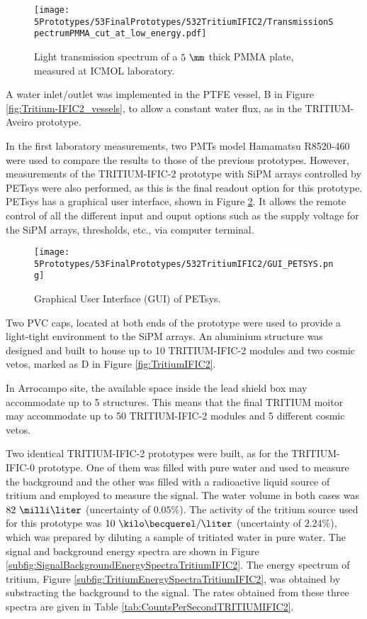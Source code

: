 \begin{figure}[h]
\centering
\texttt{[image: 5Prototypes/53FinalPrototypes/532TritiumIFIC2/TransmissionSpectrumPMMA\_cut\_at\_low\_energy.pdf]}
\caption{Light transmission spectrum of a $5~\mm$ thick PMMA plate, measured at ICMOL laboratory. \label{fig:PMMATransmissionSpectrum}}
\end{figure}	

A water inlet/outlet was implemented in the PTFE vessel, B in Figure \ref{fig:Tritium-IFIC2_vessels}, to allow a constant water flux, as in the TRITIUM-Aveiro prototype.

In the first laboratory measurements, two PMTs model Hamamatsu R8520-460 \cite{DataSheetPMTs} were used to compare the results to those of the previous prototypes. However, measurements of the TRITIUM-IFIC-2 prototype with SiPM arrays controlled by PETsys were also performed, as this is the final readout option for this prototype. PETsys has a graphical user interface, shown in Figure \ref{fig:GUI_PETSYS}. It allows the remote control of all the different input and ouput options such as the supply voltage for the SiPM arrays, thresholds, etc., via computer terminal. 

\begin{figure}[h]
\centering
\texttt{[image: 5Prototypes/53FinalPrototypes/532TritiumIFIC2/GUI\_PETSYS.png]}
\caption{Graphical User Interface (GUI) of PETsys.\label{fig:GUI_PETSYS}}
\end{figure}

Two PVC caps, located at both ends of the prototype were used to provide a light-tight environment to the SiPM arrays. An aluminium structure was designed and built to house up to 10 TRITIUM-IFIC-2 modules and two cosmic vetos, marked as D in Figure \ref{fig:TritiumIFIC2}.

In Arrocampo site, the available space inside the lead shield box may accommodate up to 5 structures. This means that the final TRITIUM moitor may accommodate up to 50 TRITIUM-IFIC-2 modules and 5 different cosmic vetos.

Two identical TRITIUM-IFIC-2 prototypes were built, as for the TRITIUM-IFIC-0 prototype. One of them was filled with pure water and used to measure the background and the other was filled with a radioactive liquid source of tritium and employed to measure the signal. The water volume in both cases was $82~\milli\liter$ (uncertainty of $0.05\%$). The activity of the tritium source used for this prototype was $10~\kilo\becquerel/\liter$ (uncertainty of $2.24\%$), which was prepared by diluting a sample of tritiated water in pure water. The signal and background energy spectra are shown in Figure \ref{subfig:SignalBackgroundEnergySpectraTritiumIFIC2}. The energy spectrum of tritium, Figure \ref{subfig:TritiumEnergySpectraTritiumIFIC2}, was obtained by substracting the background to the signal. The rates obtained from these three spectra are given in Table \ref{tab:CountsPerSecondTRITIUMIFIC2}. 

